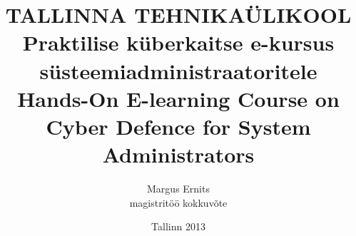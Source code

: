 \documentclass[12pt,a4paper,oneside]{article}
\begin{document}

\title{TALLINNA TEHNIKAÜLIKOOL\\
		Praktilise küberkaitse e-kursus süsteemiadministraatoritele\\
		Hands-On E-learning Course on Cyber Defence for System Administrators	
}
\author{Margus Ernits\\
		magistritöö kokkuvõte\\
		}
\date{Tallinn 2013}

\maketitle
%
%
%
\tableofcontents

\printglossaries
%
%
%
%
%
%

%


%




%

%
\end{document}

